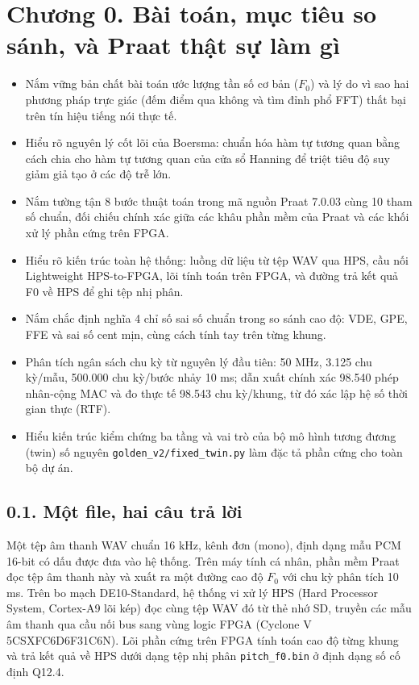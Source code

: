 \clearpage
{}
\section*{Chương 0. Bài toán, mục tiêu so sánh, và Praat thật sự làm gì}

\begin{learningobj}
\begin{itemize}[leftmargin=1.5em, itemsep=2pt]
    \item Nắm vững bản chất bài toán ước lượng tần số cơ bản ($F_0$) và lý do vì sao hai phương pháp trực giác (đếm điểm qua không và tìm đỉnh phổ FFT) thất bại trên tín hiệu tiếng nói thực tế.
    \item Hiểu rõ nguyên lý cốt lõi của Boersma: chuẩn hóa hàm tự tương quan bằng cách chia cho hàm tự tương quan của cửa sổ Hanning để triệt tiêu độ suy giảm giả tạo ở các độ trễ lớn.
    \item Nắm tường tận 8 bước thuật toán trong mã nguồn Praat 7.0.03 cùng 10 tham số chuẩn, đối chiếu chính xác giữa các khâu phần mềm của Praat và các khối xử lý phần cứng trên FPGA.
    \item Hiểu rõ kiến trúc toàn hệ thống: luồng dữ liệu từ tệp WAV qua HPS, cầu nối Lightweight HPS-to-FPGA, lõi tính toán trên FPGA, và đường trả kết quả F0 về HPS để ghi tệp nhị phân.
    \item Nắm chắc định nghĩa 4 chỉ số sai số chuẩn trong so sánh cao độ: VDE, GPE, FFE và sai số cent mịn, cùng cách tính tay trên từng khung.
    \item Phân tích ngân sách chu kỳ từ nguyên lý đầu tiên: 50 MHz, 3.125 chu kỳ/mẫu, 500.000 chu kỳ/bước nhảy 10 ms; dẫn xuất chính xác 98.540 phép nhân-cộng MAC và đo thực tế 98.543 chu kỳ/khung, từ đó xác lập hệ số thời gian thực (RTF).
    \item Hiểu kiến trúc kiểm chứng ba tầng và vai trò của bộ mô hình tương đương (twin) số nguyên \texttt{golden\_v2/fixed\_twin.py} làm đặc tả phần cứng cho toàn bộ dự án.
\end{itemize}
\end{learningobj}

\subsection*{0.1. Một file, hai câu trả lời}

Một tệp âm thanh WAV chuẩn 16 kHz, kênh đơn (mono), định dạng mẫu PCM 16-bit có dấu được đưa vào hệ thống. Trên máy tính cá nhân, phần mềm Praat đọc tệp âm thanh này và xuất ra một đường cao độ $F_0$ với chu kỳ phân tích 10 ms. Trên bo mạch DE10-Standard, hệ thống vi xử lý HPS (Hard Processor System, Cortex-A9 lõi kép) đọc cùng tệp WAV đó từ thẻ nhớ SD, truyền các mẫu âm thanh qua cầu nối bus sang vùng logic FPGA (Cyclone V 5CSXFC6D6F31C6N). Lõi phần cứng trên FPGA tính toán cao độ từng khung và trả kết quả về HPS dưới dạng tệp nhị phân \texttt{pitch\_f0.bin} ở định dạng số cố định Q12.4.

